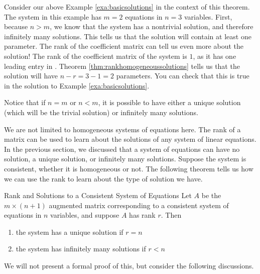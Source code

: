 Consider our above Example \ref{exa:basicsolutions} in the context of
this theorem. The system in this example has $m = 2$ equations in $n =
3$ variables.  First, because $n>m$, we know that the system has a
nontrivial solution, and therefore infinitely many solutions. This
tells us that the solution will contain at least one parameter. The
rank of the coefficient matrix can tell us even more about the
solution! The rank of the coefficient matrix of the system is $1$, as
it has one leading entry in \ef. Theorem \ref{thm:rankhomogeneoussolutions} tells us that the
solution will have $n-r = 3-1 = 2$ parameters. You can check that this
is true in the solution to Example \ref{exa:basicsolutions}.

Notice that if $n=m$ or $n<m$, it is possible to have either a unique solution (which will be the trivial solution) or infinitely many solutions. 

We are not limited to homogeneous systems of equations here. The rank of a matrix can be used to learn about the 
solutions of any system of linear equations. 
In the previous section, we discussed that a system of equations can have no solution, a unique solution, or infinitely many solutions.
Suppose the system is consistent, whether it is homogeneous or not. The following theorem tells us
how we can use the rank to learn about the type of solution we have. 

\begin{theorem}{Rank and Solutions to a Consistent System of Equations}\label{thm:rankconsistentsolutions}
Let $A$ be the $m \times \left( n+1 \right) $ augmented matrix corresponding to a consistent system of equations in $n$ variables, and suppose $A$ has rank $r$.
Then
\begin{enumerate}
\item the system has a unique solution if $r = n $
\item the system has infinitely many solutions if $r < n$
\end{enumerate}
\end{theorem}

We will not present a formal proof of this, but consider the following discussions. 

